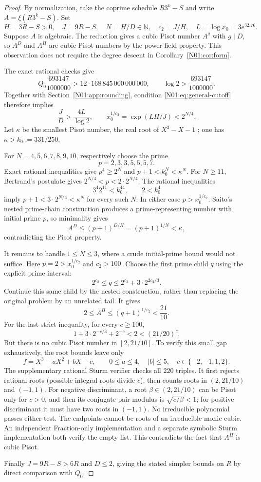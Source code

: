 \documentclass[11pt,a4paper]{article}
\theoremstyle{definition}\newtheorem{definition}[theorem]{Definition}
\theoremstyle{remark}\newtheorem{remark}[theorem]{Remark}
\newcommand{\N}{\mathbb N}\newcommand{\Z}{\mathbb Z}\newcommand{\Q}{\mathbb Q}
\begin{document}
\begin{proof}
By normalization, take the coprime schedule $R3^k-S$ and write
$A=\xi(R3^k-S)$. Set
\[
 H=3R-S>0,\quad J=9R-S,\quad N=H/D\in\N,
 \quad c_2=J/H,\quad L=\log x_0=3e^{32.76}.
\]
Suppose $A$ is algebraic. The reduction gives a cubic Pisot number
$A^g$ with $g\mid D$, so $A^D$ and $A^H$ are cubic Pisot numbers
by the power-field property. This observation does not require
the degree descent in Corollary~\ref{N01:cor:form}.

The exact rational checks give
\[
 Q_0\frac{693147}{1000000}
 >12\cdot168\,845\,000\,000\,000,
 \qquad \log2>\frac{693147}{1000000}.
\]
Together with Section~\ref{N01:app:rounding}, condition
\eqref{N01:eq:general-cutoff} therefore implies
\[
 \frac JD>\frac{4L}{\log2},\qquad
 x_0^{1/c_2}=\exp(LH/J)<2^{N/4}.
\]
Let $\kappa$ be the smallest Pisot number, the real root of
$X^3-X-1$ \cite{Siegel}; one has $\kappa>k_0:=331/250$.

For $N=4,5,6,7,8,9,10$, respectively choose the prime
\[
 p=2,3,3,5,5,5,7.
\]
Exact rational inequalities give $p^4\ge2^N$ and
$p+1<k_0^N<\kappa^N$. For $N\ge11$, Bertrand's postulate gives
$2^{N/4}<p<2\cdot2^{N/4}$. The rational inequalities
\[
 3^4 2^{11}<k_0^{44},\qquad 2<k_0^4
\]
imply $p+1<3\cdot2^{N/4}<\kappa^N$ for every such $N$.
In either case $p>x_0^{1/c_2}$. Saito's nested prime-chain
construction \cite[Lemma~9.1]{Saito} produces a prime-representing
number with initial prime $p$, so minimality gives
\[
 A^D\le(p+1)^{D/H}=(p+1)^{1/N}<\kappa,
\]
contradicting the Pisot property.

It remains to handle $1\le N\le3$, where a crude initial-prime
bound would not suffice. Here $p=2>x_0^{1/c_2}$ and $c_2>100$.
Choose the first prime child $q$ using the explicit prime interval:
\[
 2^{c_2}\le q\le2^{c_2}+3\cdot2^{2c_2/3}.
\]
Continue this same child by the nested construction, rather than
replacing the original problem by an unrelated tail. It gives
\[
 2\le A^H\le(q+1)^{1/c_2}<\frac{21}{10}.
\]
For the last strict inequality, for every $c\ge100$,
\[
 1+3\cdot2^{-c/3}+2^{-c}<2<(21/20)^c.
\]
But there is no cubic Pisot number in $[2,21/10]$. To verify this
small gap exhaustively, the root bounds leave only
\[
 f=X^3-aX^2+bX-c,\qquad
 0\le a\le4,\quad |b|\le5,\quad c\in\{-2,-1,1,2\}.
\]
The supplementary rational Sturm verifier checks all $220$ triples.
It first rejects rational roots (possible integral roots divide
$c$), then counts roots in $(2,21/10)$ and $(-1,1)$.
For negative discriminant, a root $\beta\in(2,21/10)$ can be Pisot
only for $c>0$, and then its conjugate-pair modulus is
$\sqrt{c/\beta}<1$; for positive discriminant it must have two
roots in $(-1,1)$. No irreducible polynomial passes either test.
The endpoints cannot be roots of an irreducible monic cubic.
An independent Fraction-only implementation and a separate symbolic
Sturm implementation both verify the empty list. This contradicts
the fact that $A^H$ is cubic Pisot.

Finally $J=9R-S>6R$ and $D\le2$, giving the stated simpler bounds
on $R$ by direct comparison with $Q_0$.
\end{proof}
\end{document}
